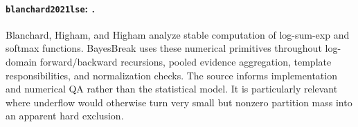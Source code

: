 
\paragraph{\texttt{blanchard2021lse}: \citet{blanchard2021lse}.}
Blanchard, Higham, and Higham analyze stable computation of log-sum-exp and softmax functions. BayesBreak uses these numerical primitives throughout log-domain forward/backward recursions, pooled evidence aggregation, template responsibilities, and normalization checks. The source informs implementation and numerical QA rather than the statistical model. It is particularly relevant where underflow would otherwise turn very small but nonzero partition mass into an apparent hard exclusion.
